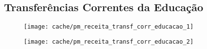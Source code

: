 
\subsection{Transferências Correntes da Educação}





\begin{figure}[H]
\center
\texttt{[image: cache/pm\_receita\_transf\_corr\_educacao\_1]}
\end{figure}

\begin{figure}[H]
\center
\texttt{[image: cache/pm\_receita\_transf\_corr\_educacao\_2]}
\end{figure}
